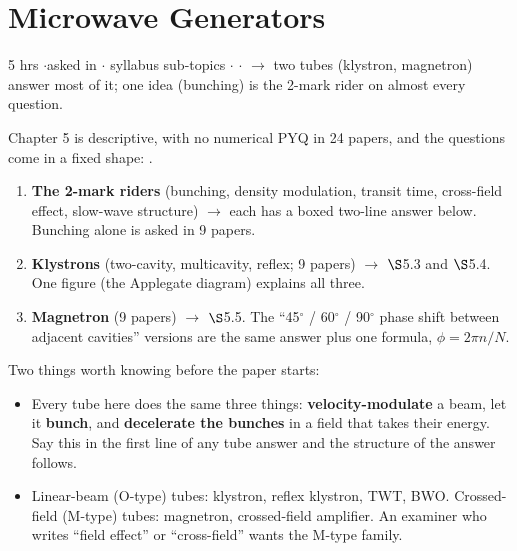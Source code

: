 \section{Microwave Generators}
{\color{sub}\footnotesize 5 hrs \gap$\cdot$\gap asked in 
\gap$\cdot$ syllabus sub-topics \gap$\cdot$\gap {} \gap$\cdot$\gap {}
$\rightarrow$ two tubes (klystron, magnetron) answer most of it; one idea (bunching) is the
2-mark rider on almost every question.}

\vspace{3pt}\noindent
\colorbox{gdL}{\makebox[\dimexpr\textwidth-2\fboxsep][l]{%
  \textcolor{gd}{\bfseries\footnotesize READ THIS FIRST}}}
\par\nobreak\vspace{3pt}

Chapter 5 is descriptive, with no numerical PYQ in 24 papers, and the questions come in a
fixed shape: .
\begin{enumerate}[label=\arabic*., leftmargin=1.4em, itemsep=1pt]
  \item \textbf{The 2-mark riders} (bunching, density modulation, transit time, cross-field
    effect, slow-wave structure) $\rightarrow$ each has a boxed two-line answer below.
    Bunching alone is asked in 9 papers.
  \item \textbf{Klystrons} (two-cavity, multicavity, reflex; 9 papers) $\rightarrow$
    $\S$5.3 and $\S$5.4. One figure (the Applegate diagram) explains all three.
  \item \textbf{Magnetron} (9 papers) $\rightarrow$ $\S$5.5. The ``45$^\circ$ / 60$^\circ$ /
    90$^\circ$ phase shift between adjacent cavities'' versions are the same answer plus
    one formula, $\phi = 2\pi n/N$.
\end{enumerate}
Two things worth knowing before the paper starts:
\begin{itemize}
  \item Every tube here does the same three things: \textbf{velocity-modulate} a beam,
    let it \textbf{bunch}, and \textbf{decelerate the bunches} in a field that takes their
    energy. Say this in the first line of any tube answer and the structure of the answer
    follows.
  \item Linear-beam (O-type) tubes: klystron, reflex klystron, TWT, BWO. Crossed-field
    (M-type) tubes: magnetron, crossed-field amplifier. An examiner who writes ``field
    effect'' or ``cross-field'' wants the M-type family.
\end{itemize}

